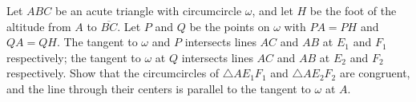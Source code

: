 Let $ABC$ be an acute triangle with circumcircle $\omega$, and let $H$ be the foot of the altitude from $A$ to $\overline{BC}$. Let $P$ and $Q$ be the points on $\omega$ with $PA=PH$ and $QA=QH$. The tangent to $\omega$ and $P$ intersects lines $AC$ and $AB$ at $E_1$ and $F_1$ respectively; the tangent to $\omega$ at $Q$ intersects lines $AC$ and $AB$ at $E_2$ and $F_2$ respectively. Show that the circumcircles of $\triangle{AE_1F_1}$ and $\triangle{AE_2F_2}$ are congruent, and the line through their centers is parallel to the tangent to $\omega$ at $A$.